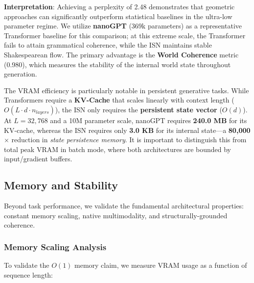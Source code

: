 \documentclass[12pt,a4paper]{article}
\begin{document}
\noindent\textbf{Interpretation}: Achieving a perplexity of 2.48 demonstrates that geometric approaches can significantly outperform statistical baselines in the ultra-low parameter regime. We utilize \textbf{nanoGPT} (369k parameters) as a representative Transformer baseline for this comparison; at this extreme scale, the Transformer fails to attain grammatical coherence, while the ISN maintains stable Shakespearean flow. The primary advantage is the \textbf{World Coherence} metric (0.980), which measures the stability of the internal world state throughout generation.

The VRAM efficiency is particularly notable in persistent generative tasks. While Transformers require a \textbf{KV-Cache} that scales linearly with context length ($O(L \cdot d \cdot n_{layers})$), the ISN only requires the \textbf{persistent state vector} ($O(d)$). At $L=32,768$ and a 10M parameter scale, nanoGPT requires \textbf{240.0 MB} for its KV-cache, whereas the ISN requires only \textbf{3.0 KB} for its internal state—a \textbf{80,000$\times$} reduction in \textit{state persistence memory}. It is important to distinguish this from total peak VRAM in batch mode, where both architectures are bounded by input/gradient buffers.

\subsection{Memory and Stability}
\label{sec:system-properties}

Beyond task performance, we validate the fundamental architectural properties: constant memory scaling, native multimodality, and structurally-grounded coherence.

\subsubsection{Memory Scaling Analysis}
\label{sec:memory-scaling}

To validate the $O(1)$ memory claim, we measure VRAM usage as a function of sequence length:
\end{document}
